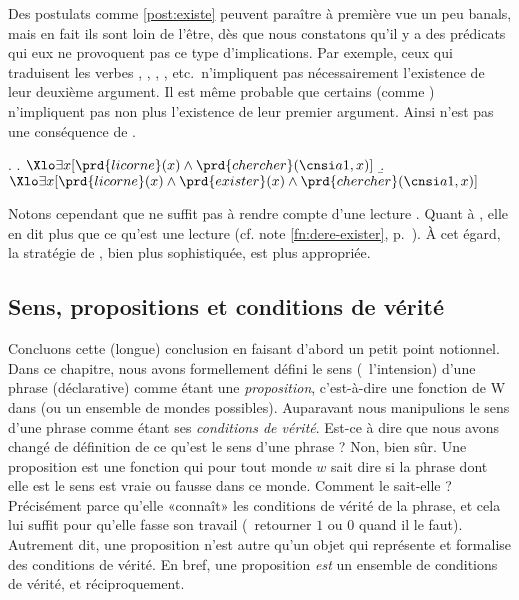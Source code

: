 \newpage

Des postulats comme \ref{post:existe} peuvent paraître à première vue un peu banals, mais en fait ils sont loin de l'être, dès que nous constatons qu'il y a des prédicats qui eux ne provoquent pas ce type d'implications. Par  exemple, ceux qui traduisent les verbes 
, , , , etc.\ n'impliquent pas nécessairement l'existence de leur deuxième argument. 
Il est même probable que certains (comme ) n'impliquent pas non plus l'existence de leur premier argument.
Ainsi \Next[b] n'est pas une conséquence de \Next[a].

\ex.
\a. \(\Xlo\exists x [\prd{licorne}(x)\wedge\prd{chercher}(\cnsi a1,x)]\)
\b. \(\Xlo\exists x [\prd{licorne}(x)\wedge\prd{exister}(x)\wedge\prd{chercher}(\cnsi a1,x)]\)

Notons cependant que \Last[a] ne suffit pas à rendre compte d'une lecture . %
Quant à \Last[b], elle en dit plus que ce qu'est une lecture  (cf. note \ref{fn:dere-exister}, p.~\pageref{fn:dere-exister}).
À cet égard, la stratégie de \citet{PTQ}, bien plus sophistiquée, est plus appropriée.



\subsection{Sens, propositions et conditions de vérité}

Concluons cette (longue) conclusion en faisant d'abord un petit point notionnel.
Dans ce chapitre, nous avons formellement défini le sens (\ie\ l'intension) d'une phrase (déclarative) comme étant une \emph{proposition}, c'est-à-dire une fonction de \Unv W dans  (ou un ensemble de mondes possibles).  Auparavant nous manipulions le sens d'une phrase comme étant ses \emph{conditions de vérité}.  Est-ce à dire que nous avons changé de définition de ce qu'est le sens d'une phrase ? Non, bien sûr.    
Une proposition est une fonction qui pour tout monde $w$ sait dire si la phrase dont elle est le sens est vraie ou fausse dans ce monde. Comment le sait-elle ? Précisément parce qu'elle «connaît» les conditions de vérité de la phrase, et cela lui suffit pour qu'elle fasse son travail (\ie\ retourner $1$ ou $0$ quand il le faut). 
Autrement dit, une proposition n'est autre qu'un objet qui représente et formalise des conditions de vérité. En bref, une proposition \emph{est} un ensemble de conditions de vérité, et réciproquement.

